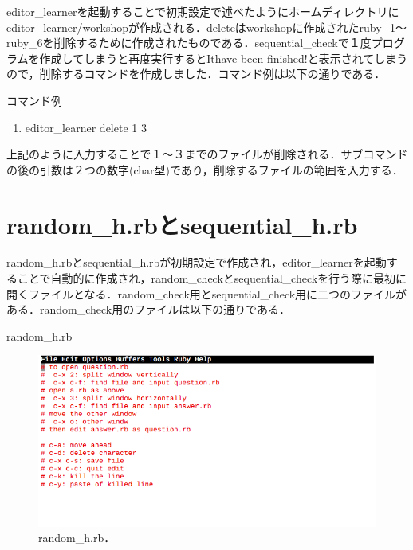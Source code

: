     editor\_learnerを起動することで初期設定で述べたようにホームディレクトリにeditor\_learner/workshopが作成される．deleteはworkshopに作成されたruby\_1〜ruby\_6を削除するために作成されたものである．sequential\_checkで１度プログラムを作成してしまうと再度実行するとIthave been finished!と表示されてしまうので，削除するコマンドを作成しました．コマンド例は以下の通りである．

コマンド例

\begin{enumerate}
\def\labelenumi{\arabic{enumi}.}
\tightlist
\item
  editor\_learner delete 1 3
\end{enumerate}

上記のように入力することで１〜３までのファイルが削除される．サブコマンドの後の引数は２つの数字(char型)であり，削除するファイルの範囲を入力する．

    \section{random\_h.rbとsequential\_h.rb}\label{random_h.rbux3068sequential_h.rb}

random\_h.rbとsequential\_h.rbが初期設定で作成され，editor\_learnerを起動することで自動的に作成され，random\_checkとsequential\_checkを行う際に最初に開くファイルとなる．random\_check用とsequential\_check用に二つのファイルがある．random\_check用のファイルは以下の通りである．

random\_h.rb

\begin{figure}[H]
\centering
\begin{center}
\includegraphics[width=150mm]{../../picture/random_h.png}
\end{center}
\caption{random\_h.rb．\label{random_h}}

\label{fig:}
\end{figure}

